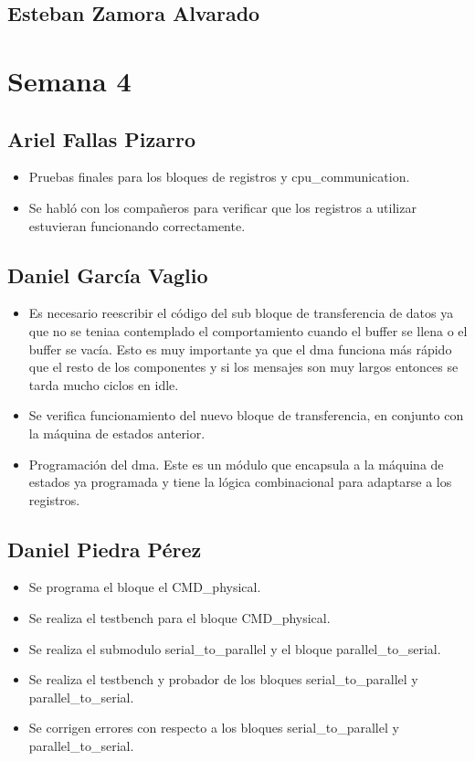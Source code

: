 \subsection{Esteban Zamora Alvarado}

\newpage

\section{Semana 4}
\subsection{Ariel Fallas Pizarro}
\begin{itemize}
\item Pruebas finales para los bloques de registros y cpu\_communication.
\item Se habló con los compañeros para verificar que los registros a utilizar estuvieran funcionando correctamente.
\end{itemize}

\subsection{Daniel García Vaglio}
\begin{itemize}
\item Es necesario reescribir el código del sub bloque de transferencia de datos ya que no se teniaa
  contemplado el comportamiento cuando el buffer se llena o el buffer se vacía. Esto es muy
  importante ya que el dma funciona más rápido que el resto de los componentes y si los mensajes son
  muy largos entonces se tarda mucho ciclos en idle. 
\item Se verifica funcionamiento del nuevo bloque de transferencia, en conjunto con la máquina de
  estados anterior. 
\item Programación del dma. Este es un módulo que encapsula a la máquina de estados ya programada y
  tiene la lógica combinacional para adaptarse a los registros. 
\end{itemize}
\subsection{Daniel Piedra Pérez}
\begin{itemize}
\item Se programa el bloque el CMD\_physical.
\item Se realiza el testbench para el bloque CMD\_physical.
\item Se realiza el submodulo serial\_to\_parallel y el bloque parallel\_to\_serial.
\item Se realiza el testbench y probador de los bloques serial\_to\_parallel y parallel\_to\_serial.
\item Se corrigen errores con respecto a los bloques serial\_to\_parallel y parallel\_to\_serial.
\end{itemize}

